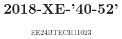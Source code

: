 \documentclass[journal,12pt,onecolumn]{IEEEtran}
\theoremstyle{remark}
\begin{document}

\vspace{3cm}


\title{2018-XE-'40-52'}
\author{EE24BTECH11023}
\maketitle




{\let\newpage\relax\maketitle}

\renewcommand{\thefigure}{\theenumi}
\renewcommand{\thetable}{\theenumi}
\setlength{\intextsep}{10pt} %


\renewcommand{\thetable}{\theenumi}
\end{document}
